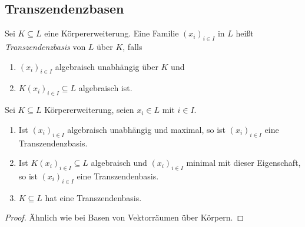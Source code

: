 \documentclass[12pt,a4paper]{scrartcl}
\theoremstyle{cplain}
\theoremstyle{cdef}
\begin{document}
\subsection{Transzendenzbasen}
\begin{defi} Sei $K\subseteq L$ eine Körpererweiterung. Eine Familie $(x_i)_{i\in I}$ in $L$ heißt \emph{Transzendenzbasis} von $L$ über $K$, falls
\begin{enumerate}
	\item $(x_i)_{i\in I}$ algebraisch unabhängig über $K$ und
	\item $K(x_i)_{i\in I}\subseteq L$ algebraisch ist.
\end{enumerate}
\end{defi}
\begin{satz}
	Sei $K\subseteq L$ Körpererweiterung, seien $x_i\in L$ mit $i\in I$.
	\begin{enumerate}
		\item Ist $(x_i)_{i\in I}$ algebraisch unabhängig und maximal, so ist $(x_i)_{i\in I}$ eine Transzendenzbasis.
		\item Ist $K(x_i)_{i\in I}\subseteq L$ algebraisch und $(x_i)_{i\in I}$ minimal mit dieser Eigenschaft, so ist $(x_i)_{i\in I}$ eine Transzendenbasis. 
		\item $K\subseteq L$ hat eine Transzendenbasis.
	\end{enumerate}
\end{satz}
\begin{proof} Ähnlich wie bei Basen von Vektorräumen über Körpern.
\end{proof}
\end{document}

